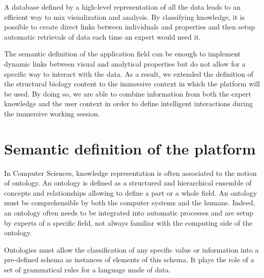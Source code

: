 \documentclass{vgtc}                          %
\begin{document}
A database defined by a high-level representation of all the data leads to an efficient way to mix visualization and analysis. By classifying knowledge, it is possible to create direct links between individuals and properties and then setup automatic retrievals of data each time an expert would need it.

The semantic definition of the application field can be enough to implement dynamic links between visual and analytical properties but do not allow for a specific way to interact with the data. As a result, we extended the definition of the structural biology content to the immersive context in which the platform will be used.
By doing so, we are able to combine information from both the expert knowledge and the user context in order to define intelligent interactions during the immersive working session.


\section{Semantic definition of the platform}

In Computer Sciences, knowledge representation is often associated to the notion of ontology. An ontology is defined as a structured and hierarchical ensemble of concepts and relationships allowing to define a part or a whole field. An ontology must be comprehensible by both the computer systems and the humans. Indeed, an ontology often needs to be integrated into automatic processes and are setup by experts of a specific field, not always familiar with the computing side of the ontology.

Ontologies must allow the classification of any specific value or information into a pre-defined schema as instances of elements of this schema. It plays the role of a set of grammatical rules for a language made of data.
\end{document}

